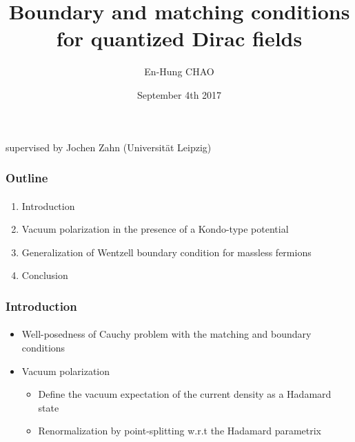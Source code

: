 \documentclass[english]{beamer}
\title{Boundary and matching conditions for quantized Dirac fields}
\author{En-Hung CHAO}
\institute{{\'E}cole Polytechnique \& Universit{\"a}t Leipzig}
\date{September 4th 2017}
\begin{document}

\begin{frame}
\titlepage%
\centerline{supervised by Jochen Zahn (Universit{\"a}t Leipzig)}
\end{frame}
\begin{frame}
\frametitle{Outline}
\framesubtitle{}

\begin{enumerate}

\item Introduction
\item Vacuum polarization in the presence of a Kondo-type potential
\item Generalization of Wentzell boundary condition for massless fermions
\item Conclusion

\end{enumerate}

\end{frame}
\begin{frame}
\frametitle{Introduction}
\framesubtitle{}

\begin{itemize}
\item<1-> Well-posedness of Cauchy problem with the matching and boundary conditions
\item<2-> Vacuum polarization 
	\begin{itemize}
		\item Define the vacuum expectation of the current density as a Hadamard state
		\item Renormalization by point-splitting w.r.t the Hadamard parametrix
	\end{itemize}
\end{itemize}

\end{frame}
\end{document}

